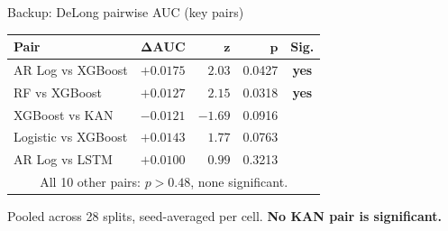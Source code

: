 \documentclass[aspectratio=169, t]{beamer}
\begin{document}
\begin{frame}{Backup: DeLong pairwise AUC (key pairs)}
\vspace{-0.5em}
\begin{center}
\renewcommand{\arraystretch}{1.15}
\scriptsize
\begin{tabular}{l r r r c}
\toprule
\textbf{Pair} & $\mathbf{\Delta AUC}$ & $\mathbf{z}$ & $\mathbf{p}$ & \textbf{Sig.} \\
\midrule
AR Log vs XGBoost   & $+0.0175$ & $2.03$  & 0.0427 & \textbf{yes} \\
RF vs XGBoost       & $+0.0127$ & $2.15$  & 0.0318 & \textbf{yes} \\
XGBoost vs KAN      & $-0.0121$ & $-1.69$ & 0.0916 & \\
Logistic vs XGBoost & $+0.0143$ & $1.77$  & 0.0763 & \\
AR Log vs LSTM      & $+0.0100$ & $0.99$  & 0.3213 & \\
\midrule
\multicolumn{5}{c}{\scriptsize All 10 other pairs: $p > 0.48$, none significant.} \\
\bottomrule
\end{tabular}
\end{center}
\vspace{0.3em}
{\scriptsize Pooled across 28 splits, seed-averaged per cell. \textbf{No KAN pair is significant.}}
\end{frame}
\end{document}
